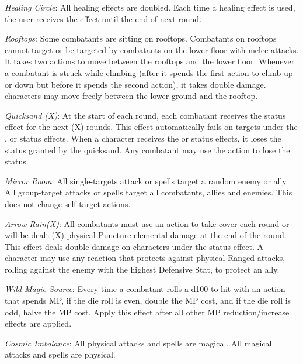 \begin{multicols}{2}
\textit{Healing Circle}: All healing effects are doubled. Each time a healing effect is used, the user receives the  effect until the end of next round.

\textit{Rooftops}: Some combatants are sitting on rooftops. Combatants on rooftops cannot target or be targeted by combatants on the lower floor with melee attacks. It takes two actions to move between the rooftops and the lower floor. Whenever a combatant is struck while climbing (after it spends the first action to climb up or down but before it spends the second action), it takes double damage.  characters may move freely between the lower ground and the rooftop.

\textit{Quicksand (X)}: At the start of each round, each combatant receives the  status effect for the next (X) rounds. This effect automatically fails on targets under the ,  or  status effects. When a character receives the  or  status effects, it loses the  status granted by the quicksand. Any combatant may use the  action to lose the  status.

\textit{Mirror Room}: All single-targets attack or spells target a random enemy or ally. All group-target attacks or spells target all combatants, allies and enemies. This does not change self-target actions.

\textit{Arrow Rain(X)}: All combatants must use an action to take cover each round or will be dealt (X) physical Puncture-elemental damage at the end of the round. This effect deals double damage on characters under the  status effect. A character may use any reaction that protects against physical Ranged attacks, rolling against the enemy with the highest Defensive Stat, to protect an ally.

\textit{Wild Magic Source}: Every time a combatant rolls a d100 to hit with an action that spends MP, if the die roll is even, double the MP cost, and if the die roll is odd, halve the MP cost. Apply this effect after all other MP reduction/increase effects are applied.

\textit{Cosmic Imbalance}: All physical attacks and spells are magical. All magical attacks and spells are physical.

\end{multicols}

%
%
%
%
%
